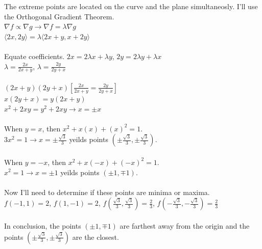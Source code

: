 \documentclass[12pt]{article}
\begin{document}
\noindent The extreme points are located on the curve and the plane simultaneosly. I'll use the Orthogonal Gradient Theorem.\\
\noindent $\nabla f \propto \nabla g \rightarrow \nabla f = \lambda \nabla g$\\
\noindent $ \langle 2x,2y\rangle = \lambda \langle 2x+y, x+2y\rangle$\\\\
\noindent Equate coefficients. $2x = 2\lambda x +\lambda y$, \hspace{10pt} $2y = 2\lambda y + \lambda x$\\
\noindent $\lambda = \frac{2x}{2x+y}$, \hspace{10pt} $\lambda = \frac{2y}{2y+x}$\\\\
\noindent $(2x+y)(2y+x)[\frac{2x}{2x+y} = \frac{2y}{2y+x}]$\\
\noindent $x(2y+x) = y(2x+y)$\\
\noindent $x^{2} + 2xy  = y^{2}+ 2xy \rightarrow x = \pm x$\\\\
\noindent When $y = x$, then $x^{2} + x(x) + (x)^{2} = 1$.\\
\noindent $3x^{2} = 1 \rightarrow x = \pm \frac{\sqrt{3}}{3}$ yeilds points $(\pm \frac{\sqrt{3}}{3}, \pm \frac{\sqrt{3}}{3})$.\\\\
\noindent When $y =-x$, then $x^{2} + x(-x) + (-x)^{2} = 1$.\\
\noindent $x^{2} = 1 \rightarrow x = \pm 1$ yeilds points $(\pm 1, \mp 1)$.\\\\
\noindent Now I'll need to determine if these points are minima or maxima.\\
\noindent $f(-1, 1) = 2$, \hspace{10pt} $f(1, -1) = 2$, \hspace{10pt} $f(\frac{\sqrt{3}}{3}, \frac{\sqrt{3}}{3}) = \frac{2}{3}$, \hspace{10pt} $f(-\frac{\sqrt{3}}{3}, -\frac{\sqrt{3}}{3}) = \frac{2}{3}$\\\\
\noindent In conclusion, the points  $(\pm 1, \mp 1)$ are farthest away from the origin and the points $(\pm \frac{\sqrt{3}}{3}, \pm \frac{\sqrt{3}}{3})$ are the closest.\\\\\\
\end{document}
